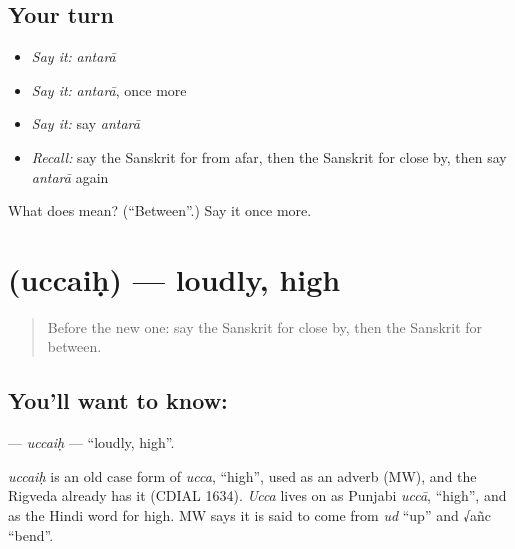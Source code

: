 \subsection*{Your turn}
\begin{itemize}
\raggedright
  \item \emph{Say it:} \emph{antarā}
  \item \emph{Say it:} \emph{antarā}, once more
  \item \emph{Say it:} say \emph{antarā}
  \item \emph{Recall:} say the Sanskrit for from afar, then the Sanskrit for close by, then say \emph{antarā} again
\end{itemize}

\begin{tcolorbox}[breakable,colback=teal!4,colframe=teal!35!black,title={Before you move on}]
What does  mean? (\textquotedblleft{}Between\textquotedblright{}.) Say it once more.
\end{tcolorbox}
\section[\texorpdfstring{\sk{उच्चैः} (uccaiḥ)}{उच्चैः (uccaiḥ)}]{ (uccaiḥ) — loudly, high}

\label{lesson:SA-C184-uccaih}



\begin{quote}
Before the new one: say the Sanskrit for close by, then the Sanskrit for between.
\end{quote}

\subsection*{You'll want to know: }
\textbf{} — \emph{uccaiḥ} — \textquotedblleft{}loudly, high\textquotedblright{}.

\begin{cousinweb}
\emph{uccaiḥ} is an old case form of \emph{ucca}, \textquotedblleft{}high\textquotedblright{}, used as an adverb (MW), and the Rigveda already has it (CDIAL 1634). \emph{Ucca} lives on as Punjabi \emph{uccā}, \textquotedblleft{}high\textquotedblright{}, and as the Hindi word for high. MW says it is said to come from \emph{ud} \textquotedblleft{}up\textquotedblright{} and √añc \textquotedblleft{}bend\textquotedblright{}.
\end{cousinweb}

